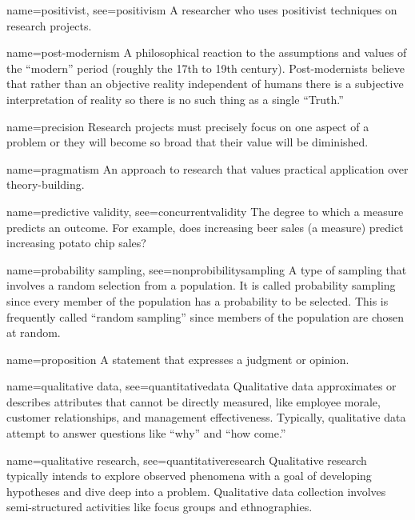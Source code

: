 {name={positivist},
 see={positivism}}
{%
	A researcher who uses positivist techniques on research projects.
}

{name={post-modernism}}
{%
	A philosophical reaction to the assumptions and values of the ``modern'' period (roughly the 17th to 19th century). Post-modernists believe that rather than an objective reality independent of humans there is a subjective interpretation of reality so there is no such thing as a single ``Truth.''
}

{name={precision}}
{%
	Research projects must precisely focus on one aspect of a problem or they will become so broad that their value will be diminished.
}

{name={pragmatism}}
{%
	An approach to research that values practical application over theory-building. 
}

{name={predictive validity},
	see={concurrentvalidity}}
{%
	The degree to which a measure predicts an outcome. For example, does increasing beer sales (a measure) predict increasing potato chip sales?
}

{name={probability sampling},
	see={nonprobibilitysampling}}
{%
	A type of sampling that involves a random selection from a population. It is called probability sampling since every member of the population has a probability to be selected. This is frequently called ``random sampling'' since members of the population are chosen at random. 
}

{name={proposition}}
{%
	A statement that expresses a judgment or opinion.
}

{name={qualitative data},
	see={quantitativedata}}
{%
	Qualitative data approximates or describes attributes that cannot be directly measured, like employee morale, customer relationships, and management effectiveness. Typically, qualitative data attempt to answer questions like ``why'' and ``how come.'' 
}

{name={qualitative research},
	see={quantitativeresearch}}
{%
	Qualitative research typically intends to explore observed phenomena with a goal of developing hypotheses and dive deep into a problem. Qualitative data collection involves semi-structured activities like focus groups and ethnographies.
}

